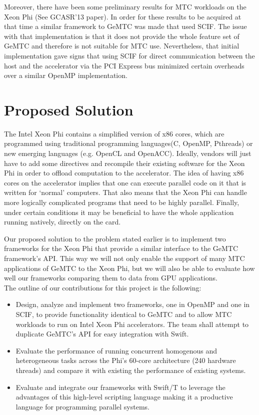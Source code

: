 \documentclass[10pt, conference, compsocconf]{IEEEtran}
\begin{document}
Moreover, there have been some preliminary results for MTC workloads on the Xeon Phi (See GCASR’13 paper). In order for these results to be acquired at that time a similar framework to GeMTC was made that used SCIF. The issue with that implementation is that it does not provide the whole feature set of GeMTC and therefore is not suitable for MTC use. Nevertheless, that initial implementation gave signs that using SCIF for direct communication between the host and the accelerator via the PCI Express bus minimized certain overheads over a similar OpenMP implementation.

\section{Proposed Solution}
The Intel Xeon Phi contains a simplified version of x86 cores, which are programmed using traditional programming languages(C, OpenMP, Pthreads) or new emerging languages (e.g. OpenCL and OpenACC). Ideally, vendors will just have to add some directives and recompile their existing software for the Xeon Phi in order to offload computation to the accelerator. The idea of having x86 cores on the accelerator implies that one can execute parallel code on it that is written for ‘normal’ computers. That also means that the Xeon Phi can handle more logically complicated programs that need to be highly parallel. Finally, under certain conditions it may be beneficial to have the whole application running natively, directly on the card.

Our proposed solution to the problem stated earlier is to implement two frameworks for the Xeon Phi that provide a similar interface to the GeMTC framework’s API. This way we will not only enable the support of many MTC applications of GeMTC to the Xeon Phi, but we will also be able to evaluate how well our frameworks comparing them to data from GPU applications.\\


The outline of our contributions for this project is the following:\\


\begin{itemize}
  \item Design, analyze and implement two frameworks, one in OpenMP and one in SCIF, to provide functionality identical to GeMTC and to allow MTC workloads to run on Intel Xeon Phi accelerators. The team shall attempt to duplicate GeMTC’s API for easy integration with Swift.
  \item Evaluate the performance of running concurrent homogenous and heterogeneous tasks across the Phi’s 60-core architecture (240 hardware threads) and compare it with existing the performance of existing systems.
  \item Evaluate and integrate our frameworks with Swift/T to leverage the advantages of this high-level scripting language making it a productive language for programming parallel systems.
\end{itemize}
\end{document}
